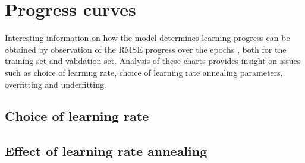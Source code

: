 \section{Progress curves}

Interesting information on how the model determines learning progress
can be obtained by observation of the RMSE progress over the epochs , both for the
training set and validation set. 
Analysis of these charts provides insight on issues such as choice of learning rate,
choice of learning rate annealing parameters, overfitting and underfitting.


\subsection{Choice of learning rate}

\subsection{Effect of learning rate annealing}

